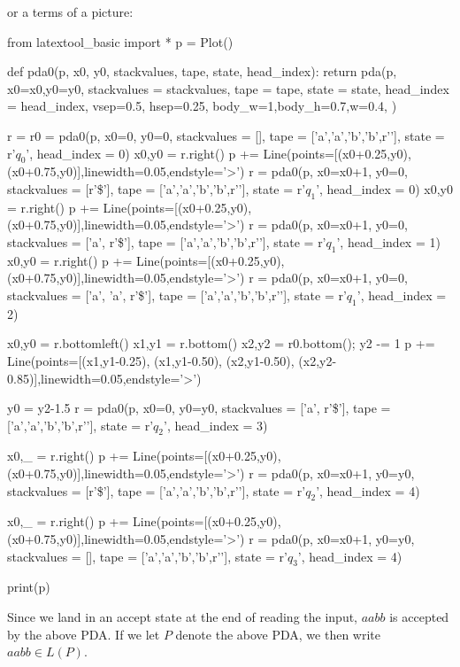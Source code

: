 or a terms of a picture:

\begin{python}
from latextool_basic import *
p = Plot()

def pda0(p, x0, y0, stackvalues, tape, state, head_index):
    return pda(p,
           x0=x0,y0=y0,
           stackvalues = stackvalues,
           tape = tape,
           state = state,
           head_index = head_index,
           vsep=0.5, hsep=0.25,
           body_w=1,body_h=0.7,w=0.4,
           )

r = r0 = pda0(p, x0=0, y0=0,
         stackvalues = [], tape = ['a','a','b','b',r'\SPACE'],
         state = r'$q_0$', head_index = 0)
x0,y0 = r.right()
p += Line(points=[(x0+0.25,y0),(x0+0.75,y0)],linewidth=0.05,endstyle='>')
r = pda0(p, x0=x0+1, y0=0,
        stackvalues = [r'\$'], tape = ['a','a','b','b',r'\SPACE'],
        state = r'$q_1$', head_index = 0)
x0,y0 = r.right()
p += Line(points=[(x0+0.25,y0),(x0+0.75,y0)],linewidth=0.05,endstyle='>')
r = pda0(p, x0=x0+1, y0=0,
    stackvalues = ['a', r'\$'], tape = ['a','a','b','b',r'\SPACE'],
    state = r'$q_1$', head_index = 1)
x0,y0 = r.right()
p += Line(points=[(x0+0.25,y0),(x0+0.75,y0)],linewidth=0.05,endstyle='>')
r = pda0(p, x0=x0+1, y0=0,
    stackvalues = ['a', 'a', r'\$'], tape = ['a','a','b','b',r'\SPACE'],
    state = r'$q_1$', head_index = 2)

x0,y0 = r.bottomleft()
x1,y1 = r.bottom()
x2,y2 = r0.bottom(); y2 -= 1
p += Line(points=[(x1,y1-0.25),
                  (x1,y1-0.50),
                  (x2,y1-0.50),
                  (x2,y2-0.85)],linewidth=0.05,endstyle='>')

y0 = y2-1.5
r = pda0(p, x0=0, y0=y0,
    stackvalues = ['a', r'\$'], tape = ['a','a','b','b',r'\SPACE'],
    state = r'$q_2$', head_index = 3)

x0,_ = r.right()
p += Line(points=[(x0+0.25,y0),(x0+0.75,y0)],linewidth=0.05,endstyle='>')
r = pda0(p, x0=x0+1, y0=y0,
    stackvalues = [r'\$'], tape = ['a','a','b','b',r'\SPACE'],
    state = r'$q_2$', head_index = 4)

x0,_ = r.right()
p += Line(points=[(x0+0.25,y0),(x0+0.75,y0)],linewidth=0.05,endstyle='>')
r = pda0(p, x0=x0+1, y0=y0,
    stackvalues = [], tape = ['a','a','b','b',r'\SPACE'],
    state = r'$q_3$', head_index = 4)


print(p)
\end{python}

Since we land in an accept state at the end of reading the input,
$aabb$ is accepted by the above PDA.
If we let $P$ denote the above PDA, we then write $aabb \in L(P)$.


